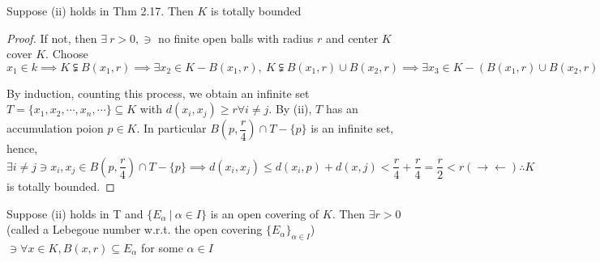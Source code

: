 \begin{lmma}[To prove (ii) to (i)]
	$ $
	
	Suppose (ii) holds in Thm 2.17. Then $K$ is totally bounded
\end{lmma}

\begin{proof}
	If not, then $\exists ~ r > 0 , \ni$ no finite open balls with radius $r$ and center $K$ cover $K$. Choose $x_1 \in k \implies K \subsetneqq B(x_1,r) \implies \exists x_2 \in K - B(x_1,r),~ K \subsetneqq B(x_1,r) \cup B(x_2,r) \implies \exists x_3 \in K - (B(x_1,r) \cup B(x_2,r))$
	
	By induction, counting this process, we obtain an infinite set $T = \{x_1,x_2,\cdots,x_n,\cdots\} \subseteq K$ with $d(x_i,x_j) \geq r \forall i \neq j$. By (ii), $T$ has an accumulation poion $p \in K$. In particular $B(p,\dfrac{r}{4}) \cap T - \{p\}$ is an infinite set, hence, $\exists i \neq j \ni x_i,x_j \in B(p,\dfrac{r}{4}) \cap T - \{p\} \implies d(x_i,x_j) \leq d(x_i,p) + d(x,j) < \dfrac{r}{4} + \dfrac{r}{4} = \dfrac{r}{2} < r (\rightarrow\leftarrow) \therefore K$ is totally bounded.
\end{proof}

\begin{lmma}
	Suppose (ii) holds in T and $\{E_{\alpha} ~|~ \alpha \in I\}$ is an open covering of $K$. Then $\exists r > 0$(called a Lebegoue number w.r.t. the open covering $\{E_{\alpha}\}_{\alpha \in I}$) $\ni \forall x \in K,B(x,r) \subseteq E_{\alpha}$ for some $\alpha \in I$
\end{lmma}

